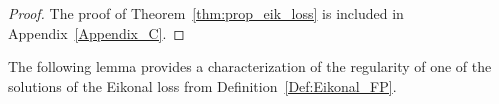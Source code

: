 \documentclass[pdflatex]{sn-jnl}%
\newtheorem{lemma}[theorem]{Lemma}
\begin{document}
\begin{proof}
The proof of Theorem~\ref{thm:prop_eik_loss} is included in Appendix~\ref{Appendix_C}.   
\end{proof}
The following lemma provides a characterization of the regularity of one of the solutions of the Eikonal loss from Definition~\ref{Def:Eikonal_FP}.
\end{document}
